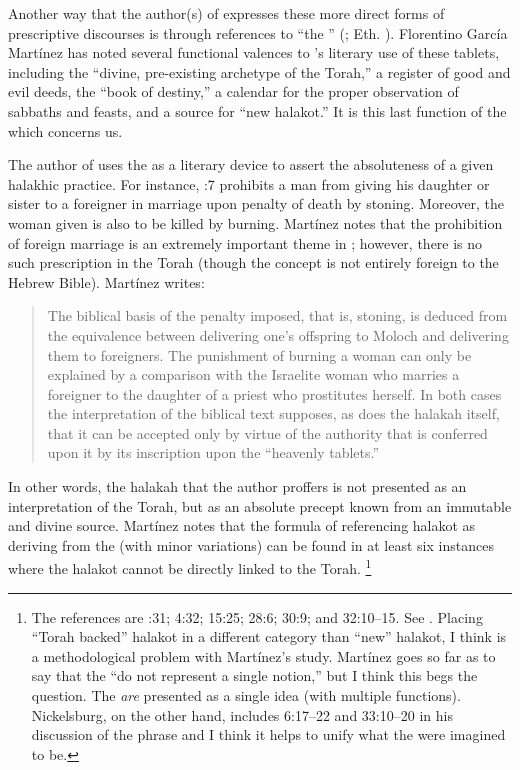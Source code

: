 Another way that the author(s) of \jub expresses these more direct forms of prescriptive discourses is through references to ``the \heavenlytablets'' (\HT; Eth. ). Florentino García Martínez has noted several functional valences to \jub's literary use of these tablets, including  the ``divine, pre-existing archetype of the Torah,'' a register of good and evil deeds, the ``book of destiny,'' a calendar for the proper observation of sabbaths and feasts, and a source for ``new halakot.''%
    \autocite{martinez_najman-tigchelaar2012}
It is this last function of the \HT which concerns us.

The author of \jub uses the \HT as a literary device to assert the absoluteness of a given halakhic practice. For instance, :7 prohibits a man from giving his daughter or sister to a foreigner in marriage upon penalty of death by stoning. Moreover, the woman given is also to be killed by burning. Martínez notes that the prohibition of foreign marriage is an extremely important theme in \jub; however, there is no such prescription in the Torah (though the concept is not entirely foreign to the Hebrew Bible). Martínez writes:
\begin{quote}
    The biblical basis of the penalty imposed, that is, stoning, is deduced from the equivalence between delivering one's offspring to Moloch and delivering them to foreigners. The punishment of burning a woman can only be explained by a comparison with the Israelite woman who marries a foreigner to the daughter of a priest who prostitutes herself. In both cases the interpretation of the biblical text supposes, as does the halakah itself, that it can be accepted only by virtue of the authority that is conferred upon it by its inscription upon the ``heavenly tablets.''\autocite[67]{martinez_najman-tigchelaar2012}
\end{quote}
\noindent
In other words, the halakah that the author proffers is not presented as an interpretation of the Torah, but as an absolute precept known from an immutable and divine source. Martínez notes that the formula of referencing halakot as deriving from the \HT (with minor variations) can be found in at least six instances where the halakot cannot be directly linked to the Torah.%
    \footnote{%
        The references are :31; 4:32; 15:25; 28:6; 30:9; and 32:10--15. See 
        \cite[64--68]{martinez_najman-tigchelaar2012}. Placing ``Torah backed'' halakot in a different category than ``new'' halakot, I think is a methodological problem with Martínez's study. Martínez goes so far as to say that the \HT ``do not represent a single notion,'' but I think this begs the question. The \HT \emph{are} presented as a single idea (with multiple functions). Nickelsburg, on the other hand, includes 6:17--22 and 33:10--20 in his discussion of the phrase and I think it helps to unify what the \HT were imagined to be.}

